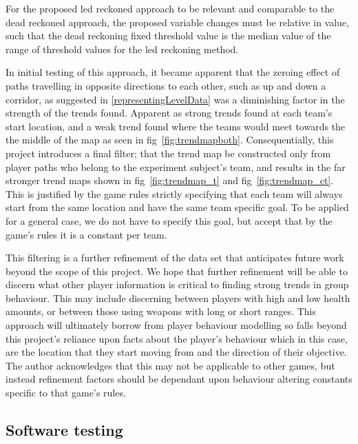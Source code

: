 \documentclass[journal]{IEEEtran}
\begin{document}
For the proposed led reckoned approach to be relevant and comparable to the dead reckoned approach, the proposed variable changes must be relative in value, such that the dead reckoning fixed threshold value is the median value of the range of threshold values for the led reckoning method.

In initial testing of this approach, it became apparent that the zeroing effect of paths travelling in opposite directions to each other, such as up and down a corridor, as suggested in \ref{representingLevelData} was a diminishing factor in the strength of the trends found. Apparent as strong trends found at each team's start location, and a weak trend found where the teams would meet towards the the middle of the map as seen in fig~\ref{fig:trendmapboth}. Consequentially, this project introduces a final filter; that the trend map be constructed only from player paths who belong to the experiment subject's team, and results in the far stronger trend maps shown in fig~\ref{fig:trendmap_t} and fig~\ref{fig:trendmap_ct}. This is justified by the game rules strictly specifying that each team will always start from the same location and have the same team specific goal. To be applied for a general case, we do not have to specify this goal, but accept that by the game's rules it is a constant per team. 


This filtering is a further refinement of the data set that anticipates future work beyond the scope of this project. We hope that further refinement will be able to discern what other player information is critical to finding strong trends in group behaviour. This may include discerning between players with high and low health amounts, or between those using weapons with long or short ranges. This approach will ultimately borrow from player behaviour modelling so falls beyond this project's reliance upon facts about the player's behaviour which in this case, are the location that they start moving from and the direction of their objective. The author acknowledges that this may not be applicable to other games, but instead refinement factors should be dependant upon behaviour altering constants specific to that game's rules.

\subsection{Software testing} \label{softwaretesting}
\end{document}
